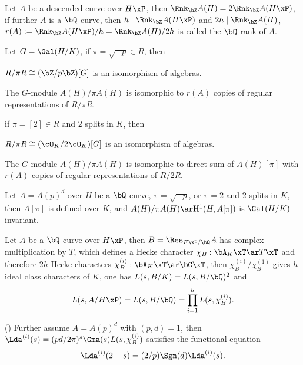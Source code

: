 \documentclass[article, a4paper, twoside]{universal}
\begin{document}
\begin{thm}
	Let $A$ be a descended curve over $H\xP$, then $\Rnk_{\bZ}A(H)=2\Rnk_{\bZ}A(H\xP)$, if further $A$ is a $\bQ$-curve, then $h\mid \Rnk_{\bZ}A(H\xP)$ and $2h\mid \Rnk_{\bZ}A(H)$, $r(A):=\Rnk_{\bZ}A(H\xP)/h=\Rnk_{\bZ}A(H)/2h$ is called the $\bQ$-rank of $A$.
\end{thm}


\begin{thm}
	Let $G=\Gal(H/K)$, if $\pi=\sqrt{-p}\in R$, then
	\begin{itm}
		\item $R/\pi R\cong(\bZ/p\bZ)[G]$ is an isomorphism of algebras.
		\item The $G$-module $A(H)/\pi A(H)$ is isomorphic to $r(A)$ copies of regular representations of $R/\pi R$.
	\end{itm}
	if $\pi=[2]\in R$ and $2$ splits in $K$, then
	\begin{itm}
		\item $R/\pi R\cong(\cO_{K}/2\cO_{K})[G]$ is an isomorphism of algebras.
		\item The $G$-module $A(H)/\pi A(H)$ is isomorphic to direct sum of $A(H)[\pi]$ with $r(A)$ copies of regular representations of $R/2R$.
	\end{itm}
\end{thm}

\begin{thm}
	Let $A=A(p)^{d}$ over $H$ be a $\bQ$-curve, $\pi=\sqrt{-p}$, or $\pi=2$ and $2$ splits in $K$, then $A[\pi]$ is defined over $K$, and $A(H)/\pi A(H)\ar \mathrm{H}_{}^{1}(H,A[\pi])$ is $\Gal(H/K)$-invariant.
\end{thm}

\begin{thm}
	Let $A$ be a $\bQ$-curve over $H\xP$, then $B=\Res_{F\xP/\bQ}A$ has complex multiplication by $T$, which defines a Hecke character $\chi_{B}:\bA_{K}\xT\ar T\xT$ and therefore $2h$ Hecke characters $\chi_{B}^{(i)}:\bA_{K}\xT\ar\bC\xT$, then $\chi_{B}^{(i)}/\chi_{B}^{(1)}$ gives $h$ ideal class characters of $K$, one has $L(s,B/K)=L(s,B/\bQ)^{2}$ and
	\[
		L(s,A/H\xP)=L(s,B/\bQ)=\prod_{i=1}^{h}L(s,\chi_{B}^{(i)}).
	\]

	(\cite[Section~19]{Gross1980}) Further assume $A=A(p)^{d}$ with $(p,d)=1$, then $\Lda^{(i)}(s)=(pd/2\pi)^{s}\Gma(s)L(s,\chi_{B}^{(i)})$ satisfies the functional equation
	\[
		\Lda^{(i)}(2-s)=(2/p)\Sgn(d)\Lda^{(i)}(s).
	\]
\end{thm}
\end{document}
